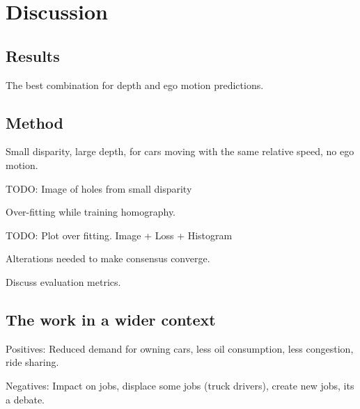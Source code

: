\chapter{Discussion}\label{cha:discussion}

\section{Results}
The best combination for depth and ego motion predictions.

\section{Method}

Small disparity, large depth, for cars moving with the same relative speed, no ego motion.

TODO: Image of holes from small disparity

Over-fitting while training homography.

TODO: Plot over fitting. Image + Loss + Histogram

Alterations needed to make consensus converge.

Discuss evaluation metrics.

\section{The work in a wider context}

Positives: Reduced demand for owning cars, less oil consumption, less congestion, ride sharing.\cite{transportation}

Negatives: Impact on jobs, displace some jobs (truck drivers), create new jobs, its a debate.\cite{sociology}